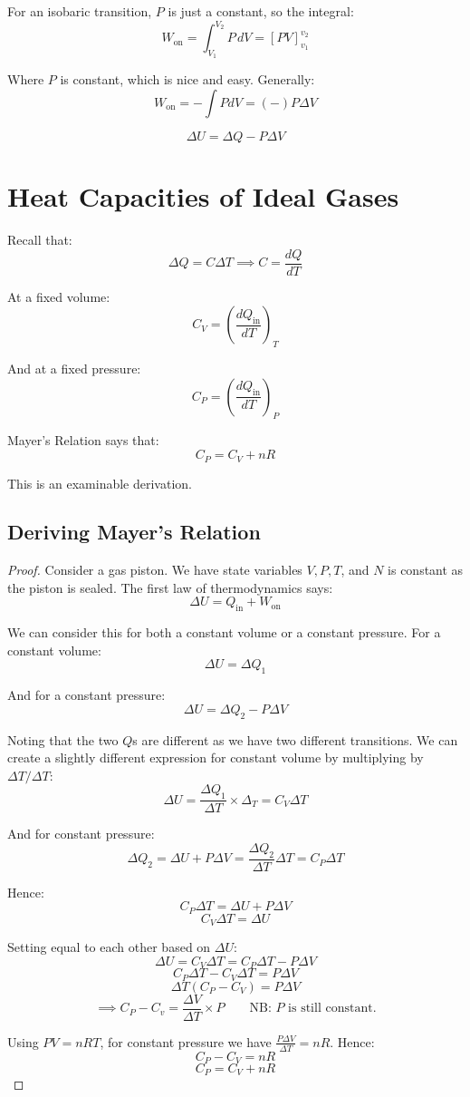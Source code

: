 For an isobaric transition, $P$ is just a constant, so the integral:
\[
    W_\text{on} = \int_{V_1}^{V_2} P \, dV = \left[PV\right]_{v_1}^{v_2}
\]

Where $P$ is constant, which is nice and easy. Generally:
\[
    W_\text{on} = - \int P dV = (-) P \Delta V
\]

\[
    \Delta U = \Delta Q - P \Delta V
\]


\section{Heat Capacities of Ideal Gases}
Recall that:
\[
    \Delta Q = C \Delta T \implies C = \frac{dQ}{dT}
\]

At a fixed volume:
\[
    C_V = \left(\frac{dQ_\text{in}}{dT}\right)_T
\]

And at a fixed pressure:
\[
    C_P = \left(\frac{dQ_\text{in}}{dT}\right)_P
\]

Mayer's Relation says that:
\[
    C_P = C_V + nR
\]

This is an examinable derivation.

\subsection{Deriving Mayer's Relation}
\begin{proof}
Consider a gas piston. We have state variables $V, P, T$, and $N$ is constant as the piston is sealed. The first law of thermodynamics says:
\[
    \Delta U = Q_\text{in} + W_\text{on}
\]

We can consider this for both a constant volume or a constant pressure. For a constant volume:
\[
    \Delta U = \Delta Q_1
\]

And for a constant pressure:
\[
    \Delta U = \Delta Q_2 - P \Delta V
\]

Noting that the two $Q$s are different as we have two different transitions. We can create a slightly different expression for constant volume by multiplying by $\Delta T / \Delta T$:
\[
    \Delta U = \frac{\Delta Q_1}{\Delta T} \times \Delta_T = C_V \Delta T
\]

And for constant pressure:
\[
    \Delta Q_2 = \Delta U + P \Delta V = \frac{\Delta Q_2}{\Delta T} \Delta T = C_P \Delta T
\]

Hence:
\[
    C_P \Delta T = \Delta U + P \Delta V
\]
\[
    C_V \Delta T = \Delta U
\]

Setting equal to each other based on $\Delta U$:
\[
    \Delta U = \boxed{C_V \Delta T = C_P \Delta T - P \Delta V}
\]
\[
    C_P \Delta T - C_V \Delta T = P \Delta V
\]
\[
    \Delta T \left(C_P - C_V\right) = P \Delta V
\]
\[
    \implies C_P - C_v = \frac{\Delta V}{\Delta T} \times P \qquad \text{NB: $P$ is still constant.}
\]

Using $PV = nRT$, for constant pressure we have $\frac{P \Delta V}{\Delta T} = nR$. Hence:
\[
    C_P - C_V = nR
\]
\[
    C_P = C_V + nR
\]
\end{proof}

